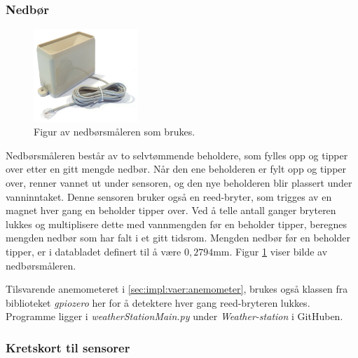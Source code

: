 
\subsubsection{Nedbør}\label{sec:impl:vaer:regn}

\begin{figure}
    \centering
    \includegraphics[width=0.35\textwidth]{implementering/vaer/rain_gauge.jpg}
    \caption{Figur av nedbørsmåleren som brukes.}
    \label{fig:impl:vaer:regn}
\end{figure}

Nedbørsmåleren består av to selvtømmende beholdere, som fylles opp og tipper over etter en gitt mengde nedbør. 
Når den ene beholderen er fylt opp og tipper over, renner vannet ut under sensoren, og den nye beholderen blir plassert under vanninntaket. 
Denne sensoren bruker også en reed-bryter, som trigges av en magnet hver gang en beholder tipper over. 
Ved å telle antall ganger bryteren lukkes og multiplisere dette med vannmengden før en beholder tipper, beregnes mengden nedbør som har falt i et gitt tidsrom. 
Mengden nedbør før en beholder tipper, er i databladet\cite{weather} definert til å være $0,2794$mm. Figur \ref{fig:impl:vaer:regn} viser bilde av nedbørsmåleren.

Tilsvarende anemometeret i \autoref{sec:impl:vaer:anemometer}, brukes også klassen  fra biblioteket \textit{gpiozero} her for å detektere hver gang reed-bryteren lukkes. Programme ligger i \textit{weatherStationMain.py} under \textit{Weather-station} i GitHuben\cite{GitHub}.

\newpage
\subsubsection{Kretskort til sensorer}\label{sec:impl:vaer:kretskort}

